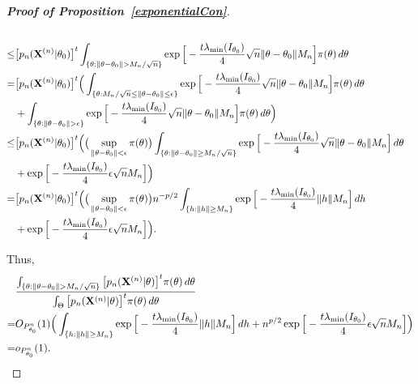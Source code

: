 \documentclass[11pt]{article}
\theoremstyle{plain}
\theoremstyle{definition}
\theoremstyle{remark}
\begin{document}
\begin{appendices}
\begin{proof}[\textbf{Proof of Proposition~\ref{exponentialCon}}]
$$\begin{aligned}
        \\
        \leq&
        \big[p_n(\BX^{(n)}|\theta_0)\big]^t 
        \int_{\{\theta:\|\theta-\theta_0\|> M_n/\sqrt{n}\}} 
        \exp\Big[-\frac{t\lambda_{\min}(I_{\theta_0})}{4}\sqrt{n}\|\theta-\theta_0\|M_n\Big]
        \pi(\theta)\, d\theta
        \\
        =&
        \big[p_n(\BX^{(n)}|\theta_0)\big]^t 
        \Big(
        \int_{\{\theta:M_n/\sqrt{n}\leq \|\theta-\theta_0\|\leq \epsilon \}} 
        \exp\Big[-\frac{t\lambda_{\min}(I_{\theta_0})}{4}\sqrt{n}\|\theta-\theta_0\|M_n\Big]
        \pi(\theta)\, d\theta
        \\
        &+
        \int_{\{\theta:\|\theta-\theta_0\|> \epsilon\}} 
        \exp\Big[-\frac{t\lambda_{\min}(I_{\theta_0})}{4}\sqrt{n}\|\theta-\theta_0\|M_n\Big]
        \pi(\theta)\, d\theta
        \Big)
        \\
        \leq& 
        \big[p_n(\BX^{(n)}|\theta_0)\big]^t 
        \Big(
        \big(\sup_{\|\theta-\theta_0\|<\epsilon}\pi(\theta)\big)
        \int_{\{\theta: \|\theta-\theta_0\|\geq M_n/\sqrt{n}\}} 
        \exp\Big[-\frac{t\lambda_{\min}(I_{\theta_0})}{4}\sqrt{n}\|\theta-\theta_0\|M_n\Big]
        \, d\theta
        \\
        &+
        \exp\Big[-\frac{t\lambda_{\min}(I_{\theta_0})}{4}\epsilon\sqrt{n}M_n\Big]
        \Big)
        \\
        =& 
        \big[p_n(\BX^{(n)}|\theta_0)\big]^t 
        \Big(
        \big(\sup_{\|\theta-\theta_0\|<\epsilon}\pi(\theta)\big)
        n^{-p/2}
        \int_{\{h: \|h\|\geq M_n\}} 
        \exp\Big[-\frac{t\lambda_{\min}(I_{\theta_0})}{4}\|h\| M_n\Big]
        \, dh
        \\
        &+
        \exp\Big[-\frac{t\lambda_{\min}(I_{\theta_0})}{4}\epsilon\sqrt{n}M_n\Big]
        \Big).
    \end{aligned}
$$

Thus,
$$
    \begin{aligned}
        &\frac{
            \int_{\{\theta:\|\theta-\theta_0\|> M_n/\sqrt{n}\}} \big[p_n(\BX^{(n)}|\theta)\big]^t \pi(\theta)\, d\theta
        }
        {
            \int_{\Theta} \big[p_n(\BX^{(n)}|\theta)\big]^t \pi(\theta)\, d\theta
        }
        \\
        =&
        O_{P_{\theta_0}^n}(1)
        \Big(
        \int_{\{h: \|h\|\geq M_n\}} 
        \exp\Big[-\frac{t\lambda_{\min}(I_{\theta_0})}{4}\|h\| M_n\Big]
        \, dh
        +
        n^{p/2}\exp\Big[-\frac{t\lambda_{\min}(I_{\theta_0})}{4}\epsilon\sqrt{n}M_n\Big]
        \Big)
        \\
        =&o_{P^n_{\theta_0}}(1).
    \end{aligned}
$$


\end{proof}
\end{appendices}
\end{document}
